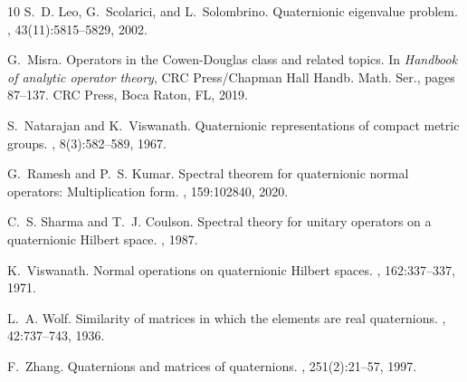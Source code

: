 \documentclass[pdflatex,sn-mathphys-num]{sn-jnl}%
\theoremstyle{thmstyleone}%
\theoremstyle{thmstyletwo}%
\theoremstyle{thmstylethree}%
\theoremstyle{definition}
\theoremstyle{remark}
\begin{document}
\begin{thebibliography}{10}
S.~D. Leo, G.~Scolarici, and L.~Solombrino.
\newblock Quaternionic eigenvalue problem.
, 43(11):5815--5829, 2002.

G.~Misra.
\newblock Operators in the {C}owen-{D}ouglas class and related topics.
\newblock In {\em Handbook of analytic operator theory}, CRC Press/Chapman Hall
  Handb. Math. Ser., pages 87--137. CRC Press, Boca Raton, FL, 2019.

S.~Natarajan and K.~Viswanath.
\newblock Quaternionic representations of compact metric groups.
, 8(3):582--589, 1967.

G.~Ramesh and P.~S. Kumar.
\newblock Spectral theorem for quaternionic normal operators: Multiplication
  form.
, 159:102840, 2020.

C.~S. Sharma and T.~J. Coulson.
\newblock Spectral theory for unitary operators on a quaternionic {H}ilbert
  space.
, 1987.

K.~Viswanath.
\newblock Normal operations on quaternionic {H}ilbert spaces.
,
  162:337--337, 1971.

L.~A. Wolf.
\newblock Similarity of matrices in which the elements are real quaternions.
, 42:737--743,
  1936.

F.~Zhang.
\newblock Quaternions and matrices of quaternions.
, 251(2):21--57, 1997.

\end{thebibliography}
\end{document}
